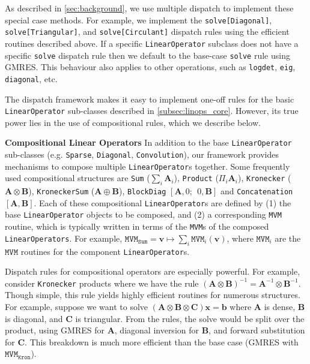 \documentclass{article}
\newcommand{\mbf}[1]{{\boldsymbol{\mathbf{#1}}}}
\renewcommand{\bm}{\mbf}
\begin{document}
As described in \autoref{sec:background}, we use multiple dispatch to implement these special case methods.
For example, we implement the \texttt{solve[Diagonal]}, \texttt{solve[Triangular]}, and \texttt{solve[Circulant]} dispatch rules using the efficient routines described above.
If a specific \texttt{LinearOperator} subclass does not have a specific \texttt{solve} dispatch rule then we default to the base-case \texttt{solve} rule using GMRES.
This behaviour also applies to other operations, such as
\texttt{logdet}, \texttt{eig}, \texttt{diagonal}, etc.

The dispatch framework makes it easy to implement one-off rules for the basic \texttt{LinearOperator} sub-classes described in \autoref{subsec:linops_core}.
However, its true power lies in the use of compositional rules, which we describe below.

\textbf{Compositional Linear Operators} \quad
In addition to the base \texttt{LinearOperator} sub-classes (e.g. \texttt{Sparse}, \texttt{Diagonal}, \texttt{Convolution}),
our framework provides mechanisms to compose multiple \texttt{LinearOperator}s together.
Some frequently used compositional structures are \texttt{Sum} ($\sum_i \bm{A}_i$), \texttt{Product} ($\Pi_i \bm{A}_i$), \texttt{Kronecker} ($\bm{A}\otimes \bm{B}$), \texttt{KroneckerSum} ($\bm{A}\oplus \bm{B}$), \texttt{BlockDiag} $[
\bm{A}, 0; \:\:
0, \bm{B}]$ and \texttt{Concatenation} $[\bm{A}, \bm{B}]$.
Each of these compositional \texttt{LinearOperator}s are defined by
(1) the base \texttt{LinearOperator} objects to be composed, and
(2) a corresponding \texttt{MVM} routine, which is typically written in terms of the \texttt{MVM}s of the composed \texttt{LinearOperators}.
For example, $\texttt{MVM}_\texttt{Sum} = \bm v \mapsto \sum_i \texttt{MVM}_i(\bm v)$,
where $\texttt{MVM}_i$ are the $\texttt{MVM}$ routines for the component \texttt{LinearOperator}s.

Dispatch rules for compositional operators are especially powerful.
For example, consider \texttt{Kronecker} products where we have the rule $(\bm A \otimes \bm B)^{-1} =   \bm A^{-1} \otimes \bm B^{-1}$.
Though simple, this rule yields highly efficient routines for numerous structures.
For example, suppose we want to solve $(\bm{A} \otimes \bm{B} \otimes \bm{C}) \bm{x} = \bm{b}$ where $\bm{A}$ is dense, $\bm{B}$ is diagonal, and $\bm{C}$ is  triangular. From the rules, the solve would be split over the product, using GMRES for $\bm{A}$, diagonal inversion for $\bm{B}$,
and forward substitution for $\bm{C}$.
This breakdown is much more efficient than the base case (GMRES with $\texttt{MVM}_\texttt{Kron}$).
\end{document}
